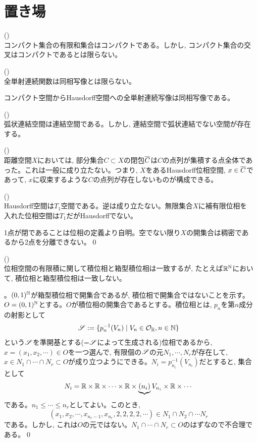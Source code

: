 \section{置き場}
\begin{prop} ()\\
コンパクト集合の有限和集合はコンパクトである。しかし, コンパクト集合の交叉はコンパクトであるとは限らない。
\end{prop}

\begin{prop} ()\\
全単射連続関数は同相写像とは限らない。
\end{prop}

\begin{rem}
コンパクト空間からHausdorff空間への全単射連続写像は同相写像である。
\end{rem}
\begin{prop} ()\\
弧状連結空間は連結空間である。しかし, 連結空間で弧状連結でない空間が存在する。
\end{prop}
\begin{prop} ()\\
距離空間$X$においては, 部分集合$C\subset X$の閉包$\overline{C}$は$C$の点列が集積する点全体であった。これは一般に成り立たない。つまり, $X$をあるHausdorff位相空間, $ x \in \overline{C}$であって, $x$に収束するような$C$の点列が存在しないものが構成できる。
\end{prop}

\begin{prop} ()\\
Hausdorff空間は$T_1$空間である。逆は成り立たない。無限集合$X$に補有限位相を入れた位相空間は$T_1$だがHausdorffでない。
\end{prop}
\prf 1点が閉であることは位相の定義より自明。空でない限り$X$の開集合は稠密であるから2点を分離できない。\qed

\begin{prop} ()\\
位相空間の有限積に関して積位相と箱型積位相は一致するが, たとえば$\mathbb{R}^{\mathbb{N}}$において, 積位相と箱型積位相は一致しない。
\end{prop}
\prf {}。$(0,1)^{\mathbb{N}}$が箱型積位相で開集合であるが, 積位相で開集合ではないことを示す。$O=(0,1)^{\mathbb{N}}$とする。$O$が積位相の開集合であるとする。積位相とは, $p_n$を第$n$成分の射影として
\[\mathscr{S} := \{ p_n^{-1}(V_{n})\mid V_n \in \mathcal{O}_{\mathbb{R}}, n\in \mathbb{N}\}\]
という$\mathscr{S}$を準開基とする(=$\mathscr{S}$によって生成される)位相であるから, $x=(x_1,x_2,\cdots )\in O$を一つ選んで, 有限個の$\mathscr{S}$の元$N_1,\cdots, N_r$が存在して, $x\in N_1\cap \cdots \cap N_r \subset O$が成り立つようにできる。$N_i = p_{n_i}^{-1}(V_{n_i})$だとすると, 集合として
\[N_i = \mathbb{R}\times \mathbb{R}\times \cdots \times \mathbb{R} \times \underbrace{(n_i)}{V_{n_i}} \times \mathbb{R}\times \cdots \]
である。$n_1\leq \cdots \leq n_r$としてよい。このとき,
\[(x_1,x_2,\cdots, x_{n_r-  1}, x_{n_r}, 2,2,2,2,\cdots)\in N_1\cap N_2\cap \cdots N_r\]
である。しかし, これは$O$の元ではない。$N_1\cap \cdots\cap N_r\subset O$のはずなので不合理である。\qed
